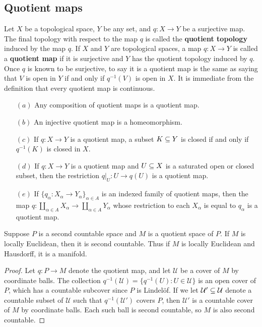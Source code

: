 \subsection{Quotient maps}
Let $X$ be a topological space, $Y$ be any set, and $q:X\to Y$ be a surjective map. The final topology with respect to the map $q$ is called the \textbf{quotient topology} induced by the map $q$. 
If $X$ and $Y$ are topological spaces, a map $q:X\to Y$ is called a \textbf{quotient map} if it is surjective and $Y$ has the quotient topology induced by $q$. Once $q$ is known to be surjective, to say it is a quotient map is the same as saying that $V$ is open in $Y$ if and only if $q^{-1}(V)$ is open in $X$. It is immediate from the definition that every quotient map is continuous.\par
\begin{proposition}
\mbox{}
\begin{itemize}
\item[$(a)$]Any composition of quotient maps is a quotient map.
\item[$(b)$]An injective quotient map is a homeomorphism.
\item[$(c)$]If $q:X\to Y$ is a quotient map, a subset $K\subseteq Y$ is closed if and only if $q^{-1}(K)$ is closed in $X$.
\item[$(d)$]If $q:X\to Y$ is a quotient map and $U\subseteq X$ is a saturated open or closed subset,
then the restriction $q|_{U}:U\to q(U)$ is a quotient map.
\item[$(e)$]If $\{q_\alpha:X_\alpha\to Y_\alpha\}_{\alpha\in A}$ is an indexed family of quotient maps, then the map $q:\coprod_{\alpha\in A}X_\alpha\to\coprod_{\alpha\in A}Y_\alpha$ whose restriction to each $X_\alpha$ is equal to $q_{\alpha}$ is a quotient map.
\end{itemize}
\end{proposition}
\begin{proposition}\label{quotient second countable}
Suppose $P$ is a second countable space and $M$ is a quotient space of $P$. If $M$ is locally Euclidean, then it is second countable. Thus if $M$ is locally Euclidean and Hausdorff, it is a manifold.
\end{proposition}
\begin{proof}
Let $q:P\to M$ denote the quotient map, and let $\mathcal{U}$ be a cover of $M$ by
coordinate balls. The collection $q^{-1}(\mathcal{U})=\{q^{-1}(U):U\in\mathcal{U}\}$
is an open cover of $P$, which has a countable subcover since $P$ is Lindel\"of. If we let $\mathcal{U}'\subseteq\mathcal{U}$ denote a countable subset of $\mathcal{U}$ such that $q^{-1}(\mathcal{U}')$ covers $P$, then $\mathcal{U}'$ is a countable cover of $M$ by coordinate balls. Each such ball is second countable, so $M$ is also second countable.
\end{proof}

